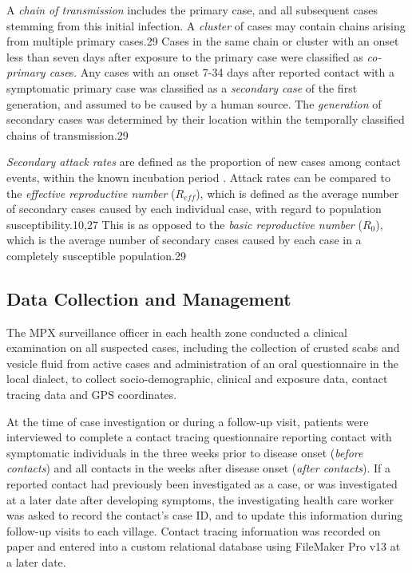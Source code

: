 A \textit{chain of transmission} includes the primary case, and all subsequent cases stemming from this initial infection. A \textit{cluster} of cases may contain chains arising from multiple primary cases.29 Cases in the same chain or cluster with an onset less than seven days after exposure to the primary case were classified as \textit{co-primary case}s. Any cases with an onset 7-34 days after reported contact with a symptomatic primary case was classified as a \textit{secondary case} of the first generation, and assumed to be caused by a human source. The \textit{generation} of secondary cases was determined by their location within the temporally classified chains of transmission.29

\textit{Secondary attack rates} are defined as the proportion of new cases among contact events, within the known incubation period \cite{Dixon2015}. Attack rates can be compared to the \textit{effective reproductive number} ($R_{eff}$), which is defined as the average number of secondary cases caused by each individual case, with regard to population susceptibility.10,27 This is as opposed to the \textit{basic reproductive number} ($R_{0}$), which is the average number of secondary cases caused by each case in a completely susceptible population.29 

\subsection{Data Collection and Management}
The MPX surveillance officer in each health zone conducted a clinical examination on all suspected cases,
including the collection of crusted scabs and vesicle fluid from active cases and administration of an oral questionnaire in the local dialect, to collect socio-demographic, clinical and exposure data, contact tracing data and GPS coordinates.

At the time of case investigation or during a follow-up visit, patients were interviewed to complete a contact tracing questionnaire reporting contact with symptomatic individuals in the three weeks prior to disease onset  (\textit{before contacts}) and all contacts in the weeks after disease onset (\textit{after contacts}). If a reported contact had previously been investigated as a case, or was investigated at a later date after developing symptoms, the investigating health care worker was asked to record the contact's case ID, and to update this information during follow-up visits to each village. Contact tracing information was recorded on paper and entered into a custom relational database using FileMaker Pro v13 at a later date.

